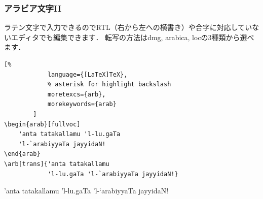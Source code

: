 \documentclass[%
    hyperref={%
        colorlinks,
        linkcolor=sDarkBlue,
        urlcolor=sDarkBlue,
        citecolor=sDarkBlue
    },
    aspectratio=169
]{beamer}
\newcommand{\inlinecommand}[1]{{\ttfamily #1}}
\begin{document}
    \begin{frame}[fragile]
        \frametitle{アラビア文字II}
        ラテン文字で入力できるのでRTL（右から左への横書き）や合字に対応していないエディタでも編集できます．
        転写の方法は\inlinecommand{dmg}, \inlinecommand{arabica}, \inlinecommand{loc}の3種類から選べます．

        \begin{leftbar}
        \begin{lstlisting}[%
            language={[LaTeX]TeX},
            % asterisk for highlight backslash
            moretexcs={arb},
            morekeywords={arab}
        ]
\begin{arab}[fullvoc]
    'anta tatakallamu 'l-lu.gaTa
    'l-`arabiyyaTa jayyidaN!
\end{arab}
\arb[trans]{'anta tatakallamu
            'l-lu.gaTa 'l-`arabiyyaTa jayyidaN!}
        \end{lstlisting}
        \end{leftbar}

        \begin{arab}[fullvoc]
            'anta tatakallamu 'l-lu.gaTa 'l-`arabiyyaTa jayyidaN!
        \end{arab}

        \bigskip

    \end{frame}
\end{document}
